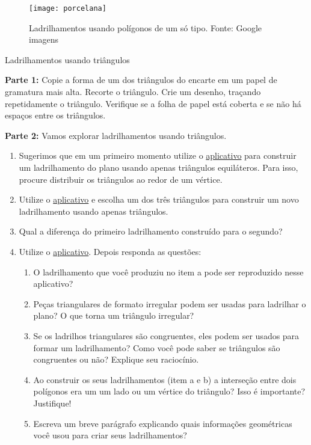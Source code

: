 \begin{figure}[H]
\centering
\texttt{[image: porcelana]}
\caption{Ladrilhamentos usando polígonos de um só tipo. Fonte: Google imagens}
\label{porce}
\end{figure}

\vspace{-5mm}
\begin{task}{Ladrilhamentos usando triângulos}\label{at_lad_tri}

\textbf{Parte 1:} Copie a forma de um dos triângulos do encarte em um papel de gramatura mais alta. Recorte o triângulo. Crie um desenho, traçando repetidamente o triângulo. Verifique se a folha de papel está coberta e se não há espaços entre os triângulos.

\textbf{Parte 2:} Vamos explorar  ladrilhamentos  usando triângulos. 
\begin{enumerate}

\item Sugerimos que em um primeiro momento utilize o  \href{https://www.geogebra.org/m/uuafzw8k}{aplicativo}  para construir um ladrilhamento do plano usando apenas triângulos equiláteros. Para isso, procure distribuir os triângulos ao redor de um vértice.

\item Utilize o  \href{https://www.geogebra.org/m/junvq3qd}{aplicativo} e escolha um dos três triângulos para construir um novo ladrilhamento usando apenas triângulos.
\item Qual a diferença do primeiro ladrilhamento construído para o segundo?
\item Utilize o  \href{https://www.geogebra.org/m/ejfw44rt}{aplicativo}. Depois responda as questões:
\begin{enumerate}
\item O ladrilhamento que você produziu no item a pode ser reproduzido nesse aplicativo?
\item 	Peças triangulares de formato irregular podem ser usadas para ladrilhar o plano? O que torna um triângulo irregular?
\item  Se os ladrilhos triangulares são congruentes, eles podem ser usados para formar um ladrilhamento? Como você pode saber se triângulos  são congruentes ou não? Explique seu raciocínio.
\item 	Ao construir os seus ladrilhamentos (item a e b) a interseção entre dois polígonos era um um lado ou um vértice do triângulo? Isso é importante? Justifique! 
\item Escreva um breve parágrafo explicando quais informações geométricas você usou para criar seus ladrilhamentos? 
\end{enumerate}
\end{enumerate}

\end{task}

